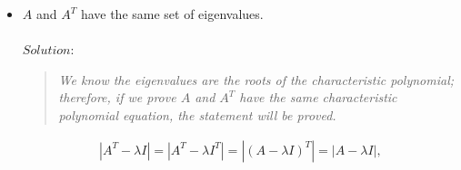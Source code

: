 \documentclass[a4paper]{article}
\begin{document}
\begin{itemize}
        \begin{align}
            AB\mathbf{v} = \lambda\mathbf{v}
        \end{align}
        
        \begin{quote}
            \emph{Let $\mathbf{u}=Bv$. Multiplying both sides by $B$, we get:}
        \end{quote}
        
        \begin{align*}
            BA\mathbf{u} = BAB\mathbf{v} = B(AB\mathbf{v}) = B(\lambda\mathbf{v})
        \end{align*}
        
        \begin{quote}
            \emph{Since $B$ commutes with $\lambda I$, we can write this as:}
        \end{quote}
        
        \begin{align*}
            BA\mathbf{u} = \lambda(B\mathbf{v}) = \lambda \mathbf{u}
        \end{align*}
        
        \begin{quote}
            \emph{Therefore, we have:}
        \end{quote}
        
        \begin{align*}
            BA \mathbf{u} = \lambda \mathbf{u}
        \end{align*}
        
        \begin{quote}
            \emph{This shows that $\lambda$ is an eigenvalue of $BA$ with corresponding eigenvector $\mathbf{u} = B\mathbf{v}$.}
        \end{quote}
        
        \begin{quote}
            \emph{Therefore, every eigenvalue of $AB$ is also an eigenvalue of $BA$, and vice versa. Since the characteristic polynomial of a matrix is the product of its eigenvalues (with appropriate algebraic multiplicities), it follows that the two matrices have the same characteristic polynomial, and hence the same eigenvalues.}
        \end{quote}
        \vspace*{2\baselineskip}
        \item $A$ and $A^{T}$ have the same set of eigenvalues.
        \\
        \\
        $Solution:$ 
        \begin{quote}
            \emph{We know the eigenvalues are the roots of the characteristic polynomial; therefore, if we prove $A$ and $A^T$ have the same characteristic polynomial equation, the statement will be proved.}
        \end{quote}
        \begin{align*} |A^T - \lambda I| = |A^T - \lambda I^T| = |(A - \lambda I)^T| = |A - \lambda I|, \end{align*}
        \end{itemize}
        	
\end{document}
